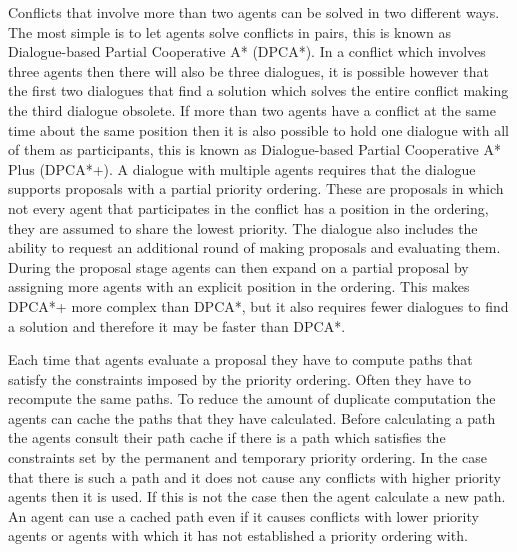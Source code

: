 Conflicts that involve more than two agents can be solved in two different
ways. The most simple is to let agents solve conflicts in pairs, this is known
as Dialogue-based Partial Cooperative A* (DPCA*). In a conflict which involves
three agents then there will also be three dialogues, it is possible however
that the first two dialogues that find a solution which solves the entire
conflict making the third dialogue obsolete. If more than two agents have a
conflict at the same time about the same position then it is also possible to
hold one dialogue with all of them as participants, this is known as
Dialogue-based Partial Cooperative A* Plus (DPCA*+). A dialogue with multiple
agents requires that the dialogue supports proposals with a partial priority
ordering. These are proposals in which not every agent that participates in the
conflict has a position in the ordering, they are assumed to share the lowest
priority. The dialogue also includes the ability to request an additional round
of making proposals and evaluating them. During the proposal stage agents can
then expand on a partial proposal by assigning more agents with an explicit
position in the ordering. This makes DPCA*+ more complex than DPCA*, but it
also requires fewer dialogues to find a solution and therefore it may be faster
than DPCA*.

Each time that agents evaluate a proposal they have to compute paths that
satisfy the constraints imposed by the priority ordering. Often they have to
recompute the same paths. To reduce the amount of duplicate computation the
agents can cache the paths that they have calculated. Before calculating a path
the agents consult their path cache if there is a path which satisfies the
constraints set by the permanent and temporary priority ordering. In the case
that there is such a path and it does not cause any conflicts with higher
priority agents then it is used. If this is not the case then the agent
calculate a new path. An agent can use a cached path even if it causes
conflicts with lower priority agents or agents with which it has not
established a priority ordering with.

